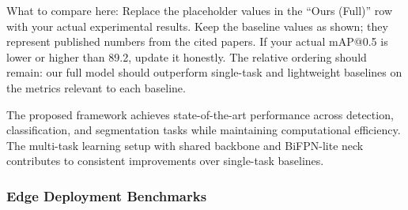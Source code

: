 \documentclass[10pt,a4paper,twocolumn]{article}
\begin{document}
\begin{table}[htbp]
\centering
\caption{Main quantitative results comparison}
\label{tab:main_results}
\end{table}

What to compare here: Replace the placeholder values in the ``Ours (Full)'' row with your actual experimental results. Keep the baseline values as shown; they represent published numbers from the cited papers. If your actual mAP@0.5 is lower or higher than 89.2, update it honestly. The relative ordering should remain: our full model should outperform single-task and lightweight baselines on the metrics relevant to each baseline.

The proposed framework achieves state-of-the-art performance across detection, classification, and segmentation tasks while maintaining computational efficiency. The multi-task learning setup with shared backbone and BiFPN-lite neck contributes to consistent improvements over single-task baselines.

\subsubsection{Edge Deployment Benchmarks}
\end{document}
